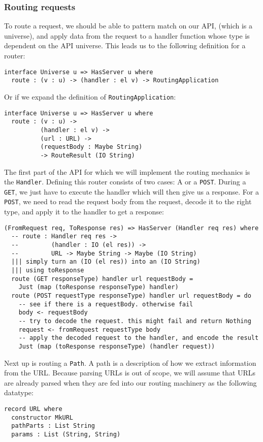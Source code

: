\documentclass[12pt,a4paper]{article}
\begin{document}
\subsubsection{Routing requests}
To route a request, we should be able to pattern match on our API, (which is a universe), and apply data from the request
to a handler function whose type is dependent on the API universe. This leads us to the following definition for a router:
\begin{verbatim}
interface Universe u => HasServer u where
  route : (v : u) -> (handler : el v) -> RoutingApplication
\end{verbatim}
Or if we expand the definition of \texttt{RoutingApplication}:
\begin{verbatim}
interface Universe u => HasServer u where
  route : (v : u) ->
          (handler : el v) ->
          (url : URL) ->
          (requestBody : Maybe String)
          -> RouteResult (IO String)
\end{verbatim}

The first part of the API for which we will implement the routing mechanics is the \texttt{Handler}.
Defining this router consists of two cases: A  or a \texttt{POST}.
During a \texttt{GET}, we just have to execute the handler which will then give us a response. 
For a \texttt{POST}, we need to read the request body from the request, decode it to the right type, and
apply it to the handler to get a response:
\begin{verbatim}
(FromRequest req, ToResponse res) => HasServer (Handler req res) where
  -- route : Handler req res -> 
  --         (handler : IO (el res)) ->
  --         URL -> Maybe String -> Maybe (IO String)
  ||| simply turn an (IO (el res)) into an (IO String) 
  ||| using toResponse
  route (GET responseType) handler url requestBody =
    Just (map (toResponse responseType) handler)
  route (POST requestType responseType) handler url requestBody = do
    -- see if there is a requestBody. otherwise fail
    body <- requestBody
    -- try to decode the request. this might fail and return Nothing
    request <- fromRequest requestType body
    -- apply the decoded request to the handler, and encode the result
    Just (map (toResponse responseType) (handler request))
\end{verbatim}

Next up is routing a \texttt{Path}. A path 
is a description of how we extract information from the URL. Because parsing URLs
is out of scope, we will assume that URLs are already parsed when they are fed into our
routing machinery as the following datatype:
\begin{verbatim}
record URL where
  constructor MkURL
  pathParts : List String
  params : List (String, String)
\end{verbatim}
\end{document}
